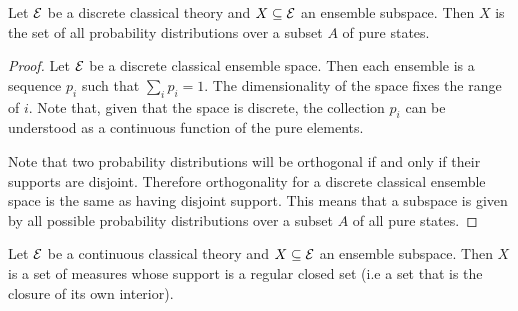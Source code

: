 \begin{prop}
	Let $\mathcal{E}$ be a discrete classical theory and $X \subseteq \mathcal{E}$ an ensemble subspace. Then $X$ is the set of all probability distributions over a subset $A$ of pure states.
\end{prop}

\begin{proof}
	Let $\mathcal{E}$ be a discrete classical ensemble space. Then each ensemble is a sequence $p_i$ such that $\sum_i p_i = 1$. The dimensionality of the space fixes the range of $i$. Note that, given that the space is discrete, the collection $p_i$ can be understood as a continuous function of the pure elements.
	
	Note that two probability distributions will be orthogonal if and only if their supports are disjoint. Therefore orthogonality for a discrete classical ensemble space is the same as having disjoint support. This means that a subspace is given by all possible probability distributions over a subset $A$ of all pure states.
\end{proof}

\begin{prop}
	Let $\mathcal{E}$ be a continuous classical theory and $X \subseteq \mathcal{E}$ an ensemble subspace. Then $X$ is a set of measures whose support is a regular closed set (i.e a set that is the closure of its own interior).
\end{prop}

